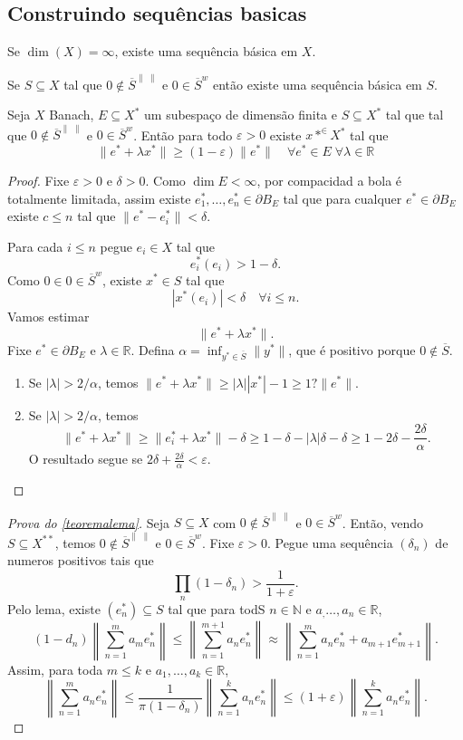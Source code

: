 \documentclass[portuguese]{article}
\theoremstyle{definition}
\newcommand{\R}{\mathbb{R}}
\newcommand{\N}{\mathbb{N}}
\begin{document}
\subsection{Construindo sequências basicas}
\begin{teo}\label{teo:subsequencia-basica}
	Se $\dim(X)=\infty$, existe uma sequência básica em $X$.
\end{teo}
\begin{teo}\label{teoremalema}
	Se $S\subseteq X$ tal que $0\notin \overline{S}^{\|\;\|}$ e $0\in\overline{S}^w$ então existe uma sequência básica em $S$.
\end{teo}
\begin{lema}
	Seja $X$ Banach, $E\subseteq X^*$ um subespaço de dimensão finita e $S\subseteq  X^*$ tal que tal que $0\notin \overline{S}^{\|\;\|}$ e $0\in\overline{S}^w$. Então para todo $\varepsilon>0$ existe $x*^\in X^*$ tal que
	\[\|e^*+\lambda x^*\|\geq(1-\varepsilon)\|e^*\|\quad\forall e^*\in E \;\forall \lambda\in \R\]
\end{lema}
\begin{proof}
	Fixe $\varepsilon>0$ e $\delta>0$. Como $\dim E<\infty$, por compacidad a bola é totalmente limitada, assim existe $e^*_1,\ldots, e^*_n\in\partial B_E$ tal que para cualquer $e^*\in\partial B_E$ existe $c\leq n$ tal que
	$\|e^*-e^*_i\|<\delta$.
	
	Para cada $i\leq n$ pegue $e_i\in X$ tal que
	\[e^*_i(e_i)>1-\delta.\]
	Como $0\in 0\in\overline{S}^w$, existe $x^*\in S$ tal que
	\[|x^*(e_i)|<\delta\quad\forall i\leq n.\]
	Vamos estimar
	\[\|e^*+\lambda x^*\|.\]
	Fixe $e^*\in\partial B_E$ e $\lambda\in\R$. Defina $\alpha=\inf_{y^*\in \overline{S}}\|y^*\|$, que é positivo porque $0\notin\overline{S}$.
	\begin{enumerate}
		\item Se $|\lambda|>2/\alpha$, temos $\|e^*+\lambda x^*\|\geq|\lambda||x^*|-1\geq 1?\|e^*\|$.
		\item Se $|\lambda|>2/\alpha$, temos
		\[\|e^*+\lambda x^*\|\geq\|e^*_i+\lambda x^*\|-\delta\geq 1-\delta-|\lambda|\delta-\delta\geq 1-2\delta-\frac{2\delta}{\alpha}.\]
		O resultado segue se $2\delta+\frac{2\delta}{\alpha}<\varepsilon$.
	\end{enumerate}
\end{proof}
\begin{proof}[Prova do \cref{teoremalema}]
	Seja $S\subseteq X$ com $0\notin \overline{S}^{\|\;\|}$ e $0\in\overline{S}^w$. Então, vendo $S\subseteq X^{**}$, temos $0\notin \overline{S}^{\|\;\|}$ e $0\in\overline{S}^w$.
	Fixe $\varepsilon>0$. Pegue uma sequência $(\delta_n)$ de numeros positivos tais que
	\[\prod_n(1-\delta_n)>\frac{1}{1+\varepsilon}.\]
	Pelo lema, existe $(e^*_n)\subseteq S$ tal que para todS $n\in\N$ e $a_,\ldots,a_n\in\R$,
	\[(1-d_n)\left\|\sum_{n=1}^ma_me^*_n\right\|\leq\left\|\sum_{n=1}^{m+1}a_ne_n^*\right\|\approx\left\|\sum_{n=1}^ma_ne^*_n+a_{m+1}e_{m+1}^*\right\|.\]
	Assim, para toda $m\leq k$ e $a_1,\ldots,a_k\in\R$,
	\[\left\|\sum_{n=1}^ma_ne^*_n\right\|\leq\frac{1}{\pi(1-\delta_n)}\left\|\sum_{n=1}^ka_ne_n^*\right\|\leq(1+\varepsilon)\left\|\sum_{n=1}^ka_ne_n^*\right\|.\]
\end{proof}
\end{document}
